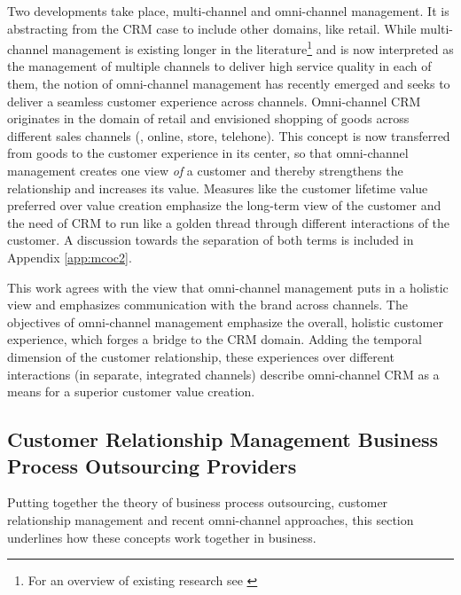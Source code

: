 		Two developments take place, multi-channel and omni-channel management. It is abstracting from the CRM case to include other domains, like retail. While multi-channel management is existing longer in the literature\footnote{For an overview of existing research see \citep{Neslin_2009}} and is now interpreted as the management of multiple channels to deliver high service quality in each of them, the notion of omni-channel management has recently emerged and seeks to deliver a seamless customer experience across channels. Omni-channel CRM originates in the domain of retail \citep{Brynjolfsson20131, rigby2011, Piotrowicz_2014} and envisioned shopping of goods across different sales channels (\ie, online, store, telehone). This concept is now transferred from goods to the customer experience in its center, so that omni-channel management creates one view \textit{of} a customer and thereby strengthens the relationship and increases its value. Measures like the customer lifetime value preferred over value creation emphasize the long-term view of the customer \citep{Lemon_2016} and the need of CRM to run like a golden thread through different interactions of the customer. A discussion towards the separation of both terms is included in Appendix \ref{app:mcoc2}.
		
	 This work agrees with the view that omni-channel management puts in a holistic view and emphasizes communication with the brand across channels. The objectives of omni-channel management emphasize the overall, holistic customer experience, which forges a bridge to the \acrshort{CRM} domain. Adding the temporal dimension of the customer relationship, these experiences over different interactions (in separate, integrated channels) describe omni-channel \acrshort{CRM} as a means for a superior customer value creation. 
	 
	
		\subsection{Customer Relationship Management Business Process Outsourcing Providers}
		\label{sec:bpocrmis}
		Putting together the theory of business process outsourcing, customer relationship management and recent omni-channel approaches, this section underlines how these concepts work together in business. 
		
